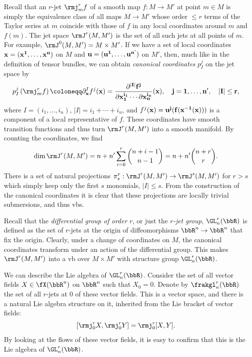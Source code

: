 Recall that an $r$-jet $\rmj^r_m f$ of a smooth map $f:M\to M'$ at point $m\in M$ is simply the equivalence class of all maps $M\to M'$ whose order $\leq r$ terms of the Taylor series  at $m$ coincide with those of $f$ in any local coordinates around $m$ and $f(m)$. The jet space $\rmJ^r(M,M')$ is the set of all such jets at all points of $m$. For example, $\rmJ^0(M,M')=M\times M'$. If we have a set of local coordinates $\bf{x}=(x^1,\ldots,x^n)$ on $M$ and $\bf{u}=(u^1,\ldots,u^{n'})$ on $M'$, then, much like in the definition of tensor bundles, we can obtain \emph{canonical coordinates} $p^j_I$ on the jet space by 
\[p^j_I\left(\rmj^r_mf\right)\coloneqq \partial^I_{\bf{x}}f^j(\bf{x})=\frac{\partial^{|I|}f^j}{\partial x_1^{i_1}\cdots\partial x_n^{i_n}}(\bf{x}),\quad j=1,\ldots,n',\quad |I|\leq r,\] 
where $I=(i_1,\ldots,i_n)$, $|I|=i_1+\cdots+i_n$, and $f^j(\bf{x})=u^j(f(\bf{x}^{-1}(\bf{x})))$ is a component of a local representative of $f$. These coordinates have smooth transition functions and thus turn $\rmJ^r(M,M')$ into a smooth manifold. By counting the coordinates, we find 
\[\dim \rmJ^r (M,M')=n+n'\sum_{i=0}^r\binom{n+i-1}{n-1}=n+n'\binom{n+r}{r}.\]
There is a set of natural projections $\pi^r_{s}:\rmJ^r(M,M')\to \rmJ^s(M,M')$ for $r>s$ which simply keep only the first $s$ monomials, $|I|\leq s$. From the construction of the canonical coordinates it is clear that these projections are locally trivial submersions, and thus \glspl{vb}.

Recall that the \emph{differential group of order $r$}, or just the \emph{$r$-jet group},  $\GL_n^r(\bbR)$ is defined as the set of $r$-jets at the origin of diffeomorphisms $\bbR^n\to \bbR^n$ that fix the origin. Clearly, under a change of coordinates on $M$, the canonical coordinates transform under an action of the differential group. This makes $\rmJ^r(M,M')$ into a \gls{vb} over $M\times M'$ with structure group $\GL_n^r(\bbR)$. 

We can describe the Lie algebra of $\GL^r_n(\bbR)$. Consider the set of all vector fields $X\in\fX(\bbR^n)$ on $\bbR^n$ such that $X_0=0$. Denote by $\frakgl^r_n(\bbR)$ the set of all $r$-jets at $0$ of these vector fields. This is a vector space, and there is a natural Lie algebra structure on it, inherited from the Lie bracket of vector fields:
\[[\rmj_0^r X,\rmj_0^r Y]=\rmj^r_0[X,Y].\]
By looking at the flows of these vector fields, it is easy to confirm that this is the Lie algebra of $\GL^r_n(\bbR)$.

